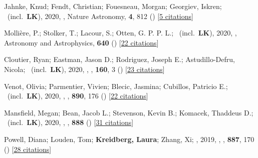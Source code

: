 \item[{\color{numcolor}\scriptsize37}] Jahnke, Knud; Fendt, Christian; Fouesneau, Morgan; Georgiev, Iskren; \etal\ (incl.\ \textbf{LK}), 2020, , Nature Astronomy, \textbf{4}, 812 () [\href{https://ui.adsabs.harvard.edu/abs/2020NatAs...4..812J}{5 citations}]

\item[{\color{numcolor}\scriptsize36}] Molli{\`e}re, P.; Stolker, T.; Lacour, S.; Otten, G. P. P. L.; \etal\ (incl.\ \textbf{LK}), 2020, , Astronomy and Astrophysics, \textbf{640} () [\href{https://ui.adsabs.harvard.edu/abs/2020A&A...640A.131M}{22 citations}]

\item[{\color{numcolor}\scriptsize35}] Cloutier, Ryan; Eastman, Jason D.; Rodriguez, Joseph E.; Astudillo-Defru, Nicola; \etal\ (incl.\ \textbf{LK}), 2020, , \aj, \textbf{160}, 3 () [\href{https://ui.adsabs.harvard.edu/abs/2020AJ....160....3C}{23 citations}]

\item[{\color{numcolor}\scriptsize34}] Venot, Olivia; Parmentier, Vivien; Blecic, Jasmina; Cubillos, Patricio E.; \etal\ (incl.\ \textbf{LK}), 2020, , \apj, \textbf{890}, 176 () [\href{https://ui.adsabs.harvard.edu/abs/2020ApJ...890..176V}{22 citations}]

\item[{\color{numcolor}\scriptsize33}] Mansfield, Megan; Bean, Jacob L.; Stevenson, Kevin B.; Komacek, Thaddeus D.; \etal\ (incl.\ \textbf{LK}), 2020, , \apj, \textbf{888} () [\href{https://ui.adsabs.harvard.edu/abs/2020ApJ...888L..15M}{31 citations}]

\item[{\color{numcolor}\scriptsize32}] Powell, Diana; Louden, Tom; \textbf{Kreidberg, Laura}; Zhang, Xi; \etal, 2019, , \apj, \textbf{887}, 170 () [\href{https://ui.adsabs.harvard.edu/abs/2019ApJ...887..170P}{28 citations}]


